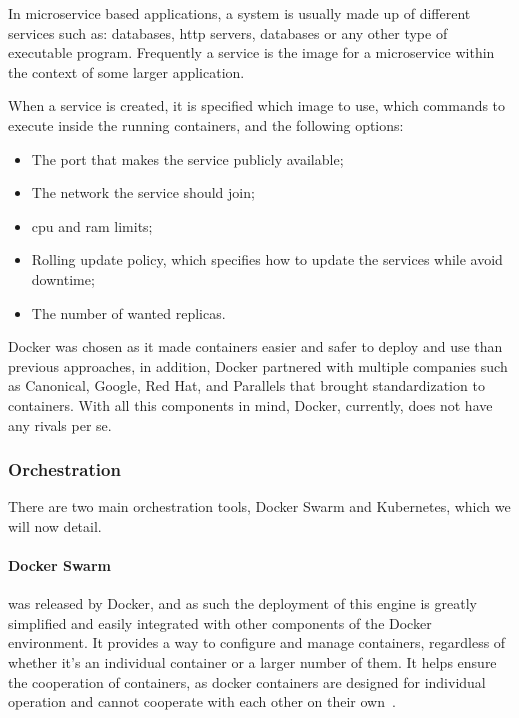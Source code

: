 In microservice based applications, a system is usually made up of different services such as: databases, \acrshort{http} servers, databases or any other type of executable program. Frequently a service is the image for a microservice within the context of some larger application.

When a service is created, it is specified which image to use, which commands to execute inside the running containers, and the following options:

\begin{itemize}
    \item The port that makes the service publicly available;
    \item The network the service should join;
    \item \acrshort{cpu} and \acrshort{ram} limits;
    \item Rolling update policy, which specifies how to update the services while avoid downtime;
    \item The number of wanted replicas.
\end{itemize}

Docker was chosen as it made containers easier and safer to deploy and use than previous approaches, in addition, Docker partnered with multiple companies such as Canonical, Google, Red Hat, and Parallels that brought standardization to containers. With all this components in mind, Docker, currently, does not have any rivals per se. 

\subsubsection{Orchestration}
\label{sss:backend-orchestration}

There are two main orchestration tools, Docker Swarm and Kubernetes, which we will now detail.


\paragraph{\textbf{Docker Swarm}} was released by Docker, and as such the deployment of this engine is greatly simplified and easily integrated with other components of the Docker environment. It provides a way to configure and manage containers, regardless of whether it's an individual container or a larger number of them. It helps ensure the cooperation of containers, as docker containers are designed for individual operation and cannot cooperate with each other on their own~\cite{docker-container-isolation}.

